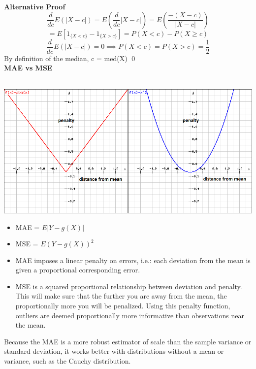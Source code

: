 \documentclass[DIV=14,titlepage=false]{scrreprt}
\begin{document}
\textbf{Alternative Proof}
\[\frac{d}{dc} E(|X-c|) = E\left(\frac{d}{dc} |X-c|\right) = E\left(\frac{-(X-c)}{|X-c|}\right)\]
\[= E\left[1_{\{X < c\}} - 1_{\{X > c\}}\right] = P(X < c) - P(X \geq c)\]
\[\frac{d}{dc} E(|X-c|) = 0 \implies P(X < c) = P(X > c) = \frac{1}{2} \]
By definition of the median, c = med(X) \qed\\

\textbf{MAE vs MSE}\\\\
\begin{minipage}[c]{0.5\textwidth}
  \includegraphics[width=\textwidth]{./Images/msemae.png}
\end{minipage}
  \hfill
\begin{minipage}[c]{0.45\textwidth}
  \begin{itemize}
    \item MAE = $E|Y - g(X)|$
    \item MSE = $E(Y - g(X))^2$
  \end{itemize}
\end{minipage}
\begin{itemize}
  \item MAE imposes a linear penalty on errors, i.e.: each deviation from the mean is given a proportional corresponding error. 
  \item MSE is a squared proportional relationship between deviation and penalty. This will make sure that the further you are away from the mean, the proportionally more you will be penalized. Using this penalty function, outliers are deemed proportionally more informative than observations near the mean.
\end{itemize}
Because the MAE is a more robust estimator of scale than the sample variance or standard deviation, it works better with distributions without a mean or variance, such as the Cauchy distribution. \\
\end{document}
